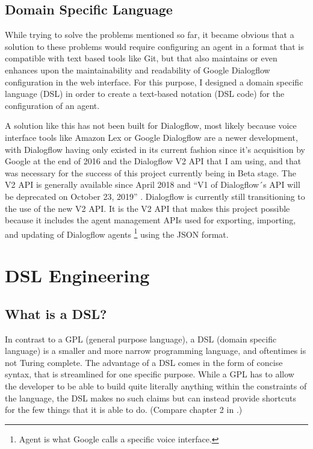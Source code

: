 \subsection{Domain Specific Language}
While trying to solve the problems mentioned so far, it became obvious that a solution to these problems would require configuring an agent in a format that is compatible with text based tools like Git, but that also maintains or even enhances upon the maintainability and readability of Google Dialogflow configuration in the web interface.
For this purpose, I designed a domain specific language (DSL) in order to create a text-based notation (DSL code) for the configuration of an agent.

A solution like this has not been built for Dialogflow, most likely because voice interface tools like Amazon Lex or Google Dialogflow are a newer development, with Dialogflow having only existed in its current fashion since it's acquisition by Google at the end of 2016 \cite{Huffman2016} and the Dialogflow V2 API that I am using, and that was necessary for the success of this project currently being in Beta stage. The V2 API is generally available since April 2018 \cite{Imrie-Situnayake2018} and “V1 of Dialogflow´s API will be deprecated on October 23, 2019” \cite[page 1]{Dialogflow}.
Dialogflow is currently still transitioning to the use of the new V2 API.
It is the V2 API that makes this project possible because it includes the agent management APIs used for exporting, importing, and updating of Dialogflow agents \footnote{Agent is what Google calls a specific voice interface.} using the JSON format.


\section{DSL Engineering}


\subsection{What is a DSL?}

In contrast to a GPL (general purpose language), a DSL (domain specific language) is a smaller and more narrow programming language, and oftentimes is not Turing complete. The advantage of a DSL comes in the form of concise syntax, that is streamlined for one specific purpose. While a GPL has to allow the developer to be able to build quite literally anything within the constraints of the language, the DSL makes no such claims but can instead provide shortcuts for the few things that it is able to do. (Compare chapter 2 in \cite{Voelter2013}.)

